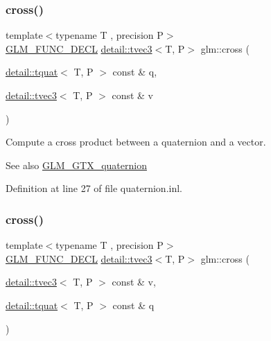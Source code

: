 \subsubsection{\texorpdfstring{cross()}{cross()}\hspace{0.1cm}{\footnotesize\ttfamily [1/2]}}
{\footnotesize\ttfamily template$<$typename T , precision P$>$ \\
\hyperlink{setup_8hpp_ab2d052de21a70539923e9bcbf6e83a51}{G\+L\+M\+\_\+\+F\+U\+N\+C\+\_\+\+D\+E\+CL} \hyperlink{structglm_1_1detail_1_1tvec3}{detail\+::tvec3}$<$T, P$>$ glm\+::cross (\begin{DoxyParamCaption}\item[{\hyperlink{structglm_1_1detail_1_1tquat}{detail\+::tquat}$<$ T, P $>$ const \&}]{q,  }\item[{\hyperlink{structglm_1_1detail_1_1tvec3}{detail\+::tvec3}$<$ T, P $>$ const \&}]{v }\end{DoxyParamCaption})}

Compute a cross product between a quaternion and a vector.

\begin{DoxySeeAlso}{See also}
\hyperlink{group__gtx__quaternion}{G\+L\+M\+\_\+\+G\+T\+X\+\_\+quaternion} 
\end{DoxySeeAlso}


Definition at line 27 of file quaternion.\+inl.

\mbox{\label{group__gtx__quaternion_ga7794f940ba271ff846ea706204b0259a}} 
\subsubsection{\texorpdfstring{cross()}{cross()}\hspace{0.1cm}{\footnotesize\ttfamily [2/2]}}
{\footnotesize\ttfamily template$<$typename T , precision P$>$ \\
\hyperlink{setup_8hpp_ab2d052de21a70539923e9bcbf6e83a51}{G\+L\+M\+\_\+\+F\+U\+N\+C\+\_\+\+D\+E\+CL} \hyperlink{structglm_1_1detail_1_1tvec3}{detail\+::tvec3}$<$T, P$>$ glm\+::cross (\begin{DoxyParamCaption}\item[{\hyperlink{structglm_1_1detail_1_1tvec3}{detail\+::tvec3}$<$ T, P $>$ const \&}]{v,  }\item[{\hyperlink{structglm_1_1detail_1_1tquat}{detail\+::tquat}$<$ T, P $>$ const \&}]{q }\end{DoxyParamCaption})}

